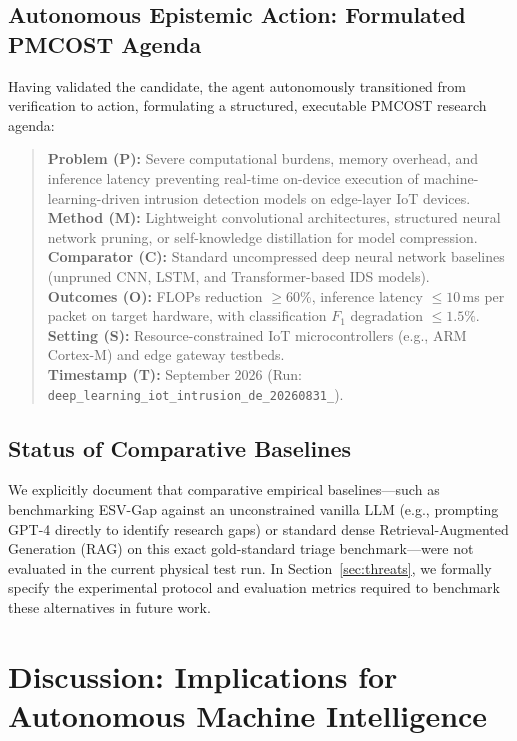 \documentclass[conference,10pt]{IEEEtran}
\newcommand{\method}{ESV-Gap}
\newcommand{\runid}{\texttt{deep\_learning\_\allowbreak iot\_intrusion\_\allowbreak de\_20260831\_\allowbreak 114802}}
\begin{document}
\subsection{Autonomous Epistemic Action: Formulated PMCOST Agenda}
Having validated the candidate, the agent autonomously transitioned from verification to action, formulating a structured, executable PMCOST research agenda:
\begin{quote}
\small
\textbf{Problem (P):} Severe computational burdens, memory overhead, and inference latency preventing real-time on-device execution of machine-learning-driven intrusion detection models on edge-layer IoT devices.\\
\textbf{Method (M):} Lightweight convolutional architectures, structured neural network pruning, or self-knowledge distillation for model compression.\\
\textbf{Comparator (C):} Standard uncompressed deep neural network baselines (unpruned CNN, LSTM, and Transformer-based IDS models).\\
\textbf{Outcomes (O):} FLOPs reduction $\ge 60\%$, inference latency $\le 10$\,ms per packet on target hardware, with classification $F_1$ degradation $\le 1.5\%$.\\
\textbf{Setting (S):} Resource-constrained IoT microcontrollers (e.g., ARM Cortex-M) and edge gateway testbeds.\\
\textbf{Timestamp (T):} September 2026 (Run: \runid{}).
\end{quote}

\subsection{Status of Comparative Baselines}
We explicitly document that comparative empirical baselines---such as benchmarking \method{} against an unconstrained vanilla LLM (e.g., prompting GPT-4 directly to identify research gaps) or standard dense Retrieval-Augmented Generation (RAG) on this exact gold-standard triage benchmark---were not evaluated in the current physical test run. In Section~\ref{sec:threats}, we formally specify the experimental protocol and evaluation metrics required to benchmark these alternatives in future work.

\section{Discussion: Implications for Autonomous Machine Intelligence}
\end{document}
